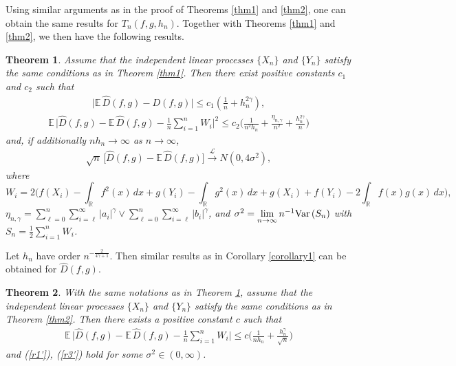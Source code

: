 \documentclass[11pt]{article}
\newtheorem {theorem}{Theorem}[section]
\def\R{{\mathbb R}}
\def\E{{{\mathbb E}\,}}
\def\Var{{\mathop {{\rm Var\, }}}}
\begin{document}
Using similar arguments as in the proof of Theorems \ref{thm1}  and \ref{thm2}, one can obtain the same results for $T_n(f, g, h_n)$. Together with Theorems \ref{thm1} and \ref{thm2}, we then have the following results. 
\begin{theorem} \label{thm3} 
Assume that the  independent linear processes $\{X_n\}$ and $\{Y_n\}$ satisfy the same conditions as in Theorem \ref{thm1}. Then there exist positive constants $c_1$ and $c_2$ such that
\begin{align} \label{r1'}
\Big|\E \widehat{D}(f,g)-D(f,g)\Big|\leq c_1 \left(\frac{1}{n}+ h^{2\gamma}_n\right),
\end{align}
\begin{align}  \label{r2'}
\E\Big|\widehat{D}(f,g)-\E \widehat{D}(f,g)-\frac{1}{n}\sum^n_{i=1}W_i\Big|^2 \leq c_2 \Big(\frac{1}{n^2h_n}+\frac{\eta_{n,\gamma}}{n^2}+\frac{h^{2\gamma}_n}{n}\Big)
\end{align}
and, if additionally $n h_n\to \infty$ as $n\to\infty$,
\begin{align} \label{r3'}
\sqrt{n}\, \Big[\widehat{D}(f,g)-\E \widehat{D}(f,g)\Big]\overset{\mathcal{L}}{\longrightarrow} N(0,4\sigma^2),
\end{align}
where 
\[
W_i=2\Big(f(X_i)-\int_{\R} f^2(x)\, dx+g(Y_i)-\int_{\R} g^2(x)\, dx+g(X_{i})+f(Y_{i})-2\int_{\R} f(x)g(x)\, dx\Big),
\] 
$\eta_{n,\gamma}=\sum\limits_{\ell=0}^n\sum\limits_{i=\ell}^\infty |a_i|^\gamma\vee \sum\limits_{\ell=0}^n\sum\limits_{i=\ell}^\infty |b_i|^\gamma$, and $\sigma^2=\lim\limits_{n\to\infty} n^{-1}\Var(S_n)$ with $S_n=\frac{1}{2}\sum\limits^n_{i=1}W_i$.  
\end{theorem}


Let $h_n$ have order $n^{-\frac{2}{4\gamma+1}}$. Then similar results as in Corollary \ref{corollary1} can be obtained for $\widehat{D}(f,g)$.




\begin{theorem} \label{thm4} 
With the same notations as in Theorem \ref{thm3}, assume that the independent linear processes $\{X_n\}$ and $\{Y_n\}$ satisfy the same conditions as in Theorem \ref{thm2}. Then there exists a positive constant $c$ such that 
\begin{align}  
\E\Big|\widehat{D}(f,g)-\E \widehat{D}(f,g)-\frac{1}{n}\sum^n_{i=1}W_i\Big| \leq c \Big(\frac{1}{nh_n}+\frac{h^{\gamma}_n}{\sqrt{n}}\Big)
\end{align}
and (\ref{r1'}), (\ref{r3'}) hold for some $\sigma^2\in(0,\infty)$. 
\end{theorem}
\end{document}

